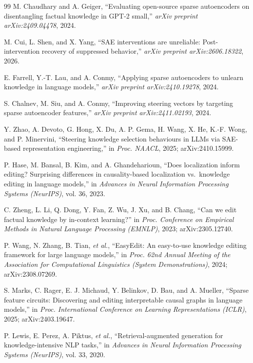 \begin{thebibliography}{99}
 M. Chaudhary and A. Geiger, ``Evaluating open-source sparse autoencoders on disentangling factual knowledge in GPT-2 small,'' \textit{arXiv preprint arXiv:2409.04478}, 2024.

 M. Cui, L. Shen, and X. Yang, ``SAE interventions are unreliable: Post-intervention recovery of suppressed behavior,'' \textit{arXiv preprint arXiv:2606.18322}, 2026.

 E. Farrell, Y.-T. Lau, and A. Conmy, ``Applying sparse autoencoders to unlearn knowledge in language models,'' \textit{arXiv preprint arXiv:2410.19278}, 2024.

 S. Chalnev, M. Siu, and A. Conmy, ``Improving steering vectors by targeting sparse autoencoder features,'' \textit{arXiv preprint arXiv:2411.02193}, 2024.

 Y. Zhao, A. Devoto, G. Hong, X. Du, A. P. Gema, H. Wang, X. He, K.-F. Wong, and P. Minervini, ``Steering knowledge selection behaviours in LLMs via SAE-based representation engineering,'' in \textit{Proc. NAACL}, 2025; arXiv:2410.15999.

 P. Hase, M. Bansal, B. Kim, and A. Ghandeharioun, ``Does localization inform editing? Surprising differences in causality-based localization vs.\ knowledge editing in language models,'' in \textit{Advances in Neural Information Processing Systems (NeurIPS)}, vol. 36, 2023.

 C. Zheng, L. Li, Q. Dong, Y. Fan, Z. Wu, J. Xu, and B. Chang, ``Can we edit factual knowledge by in-context learning?'' in \textit{Proc. Conference on Empirical Methods in Natural Language Processing (EMNLP)}, 2023; arXiv:2305.12740.

 P. Wang, N. Zhang, B. Tian, \textit{et al.}, ``EasyEdit: An easy-to-use knowledge editing framework for large language models,'' in \textit{Proc. 62nd Annual Meeting of the Association for Computational Linguistics (System Demonstrations)}, 2024; arXiv:2308.07269.

 S. Marks, C. Rager, E. J. Michaud, Y. Belinkov, D. Bau, and A. Mueller, ``Sparse feature circuits: Discovering and editing interpretable causal graphs in language models,'' in \textit{Proc. International Conference on Learning Representations (ICLR)}, 2025; arXiv:2403.19647.

 P. Lewis, E. Perez, A. Piktus, \textit{et al.}, ``Retrieval-augmented generation for knowledge-intensive NLP tasks,'' in \textit{Advances in Neural Information Processing Systems (NeurIPS)}, vol. 33, 2020.


\end{thebibliography}
